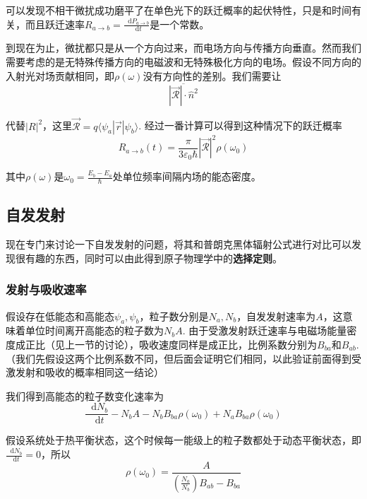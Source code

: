 \documentclass[UTF8]{ctexart}
\newcommand*{\dif}{\mathop{}\!\mathrm{d}}
\begin{document}
    可以发现不相干微扰成功磨平了在单色光下的跃迁概率的起伏特性，只是和时间有关，而且跃迁速率$R_{a \rightarrow b} = \frac{\dif P_{a \rightarrow b}}{\dif t}$是一个常数。


    到现在为止，微扰都只是从一个方向过来，而电场方向与传播方向垂直。然而我们需要考虑的是无特殊传播方向的电磁波和无特殊极化方向的电场。假设不同方向的入射光对场贡献相同，即$\rho(\omega)$没有方向性的差别。我们需要让
    \begin{equation}
        \overline{|\vec{\mathcal{R}}| \cdot \hat{n}^2}
    \end{equation}

\noindent 代替$|R|^2$，这里$\vec{\mathcal{R}} = q\langle \psi_a | \vec{r} | \psi_b \rangle $. 经过一番计算可以得到这种情况下的跃迁概率
\begin{equation}
    R_{a \rightarrow b}(t) = \frac{\pi}{3 \varepsilon_0 \hbar}|\vec{\mathcal{R}}|^2 \rho (\omega_0)
\end{equation}

\noindent 其中$\rho(\omega)$是$\omega_0 = \frac{E_b-E_a}{\hbar}$处单位频率间隔内场的能态密度。

    \subsection{自发发射}
    现在专门来讨论一下自发发射的问题，将其和普朗克黑体辐射公式进行对比可以发现很有趣的东西，同时可以由此得到原子物理学中的\textbf{选择定则}。
    \subsubsection{发射与吸收速率}
    假设存在低能态和高能态$\psi_a,\psi_b$，粒子数分别是$N_a,N_b$，自发发射速率为$A$，这意味着单位时间离开高能态的粒子数为$N_b A$. 由于受激发射跃迁速率与电磁场能量密度成正比（见上一节的讨论），吸收速度同样是成正比，比例系数分别为$B_{ba}$和$B_{ab}$.（我们先假设这两个比例系数不同，但后面会证明它们相同，以此验证前面得到受激发射和吸收的概率相同这一结论）

    我们得到高能态的粒子数变化速率为
    \begin{equation}
        \frac{\dif N_b}{\dif t} - N_b A - N_b B_{ba} \rho(\omega_0) + N_a B_{ba} \rho(\omega_0)
    \end{equation}

\noindent 假设系统处于热平衡状态，这个时候每一能级上的粒子数都处于动态平衡状态，即$\frac{\dif N_b}{\dif t} = 0$，所以
\begin{equation}
    \rho(\omega_0) = \frac{A}{\left(\frac{N_a}{N_b}\right)B_{ab} - B_{ba}}
\end{equation}
\end{document}
